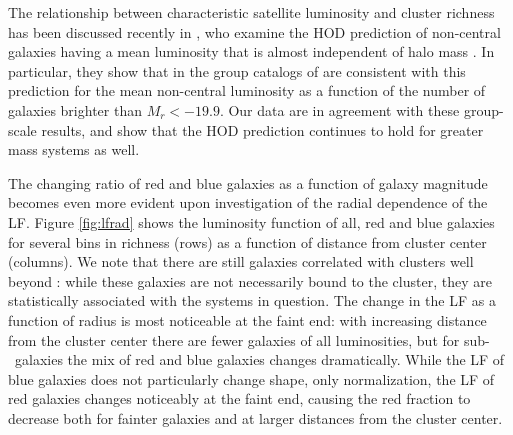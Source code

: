 \documentclass{emulateapj}
\begin{document}
\begin{figure}
\end{figure}

The relationship between characteristic satellite luminosity and
cluster richness has been discussed recently in \citet{Skibba07}, who
examine the HOD prediction of non-central galaxies having a mean
luminosity that is almost independent of halo mass
\citep{Skibba06}. In particular, they show that in the group catalogs
of \citet{Yang05,Berlind06} are consistent with this prediction for
the mean non-central luminosity as a function of the number of
galaxies brighter than $M_r < -19.9$. Our data are in agreement with
these group-scale results, and show that the HOD
prediction continues to hold for greater mass systems as well.

The changing ratio of red and blue galaxies as a function of galaxy
magnitude becomes even more evident upon investigation of the radial
dependence of the LF. Figure \ref{fig:lfrad} shows the luminosity
function of all, red and blue galaxies for several bins in richness
(rows) as a function of distance from cluster center (columns). We
note that there are still galaxies correlated with clusters well
beyond \rtwo: while these galaxies are not necessarily bound to the
cluster, they are statistically associated with the systems in
question. 
The change in the LF as a function of radius is most noticeable at the
faint end: with increasing distance from the cluster center there are
fewer galaxies of all luminosities, but for sub-\lstar\ galaxies the
mix of red and blue galaxies changes dramatically. While the LF of
blue galaxies does not particularly change shape, only normalization,
the LF of red galaxies changes noticeably at the faint end,
causing the red fraction to decrease both for fainter galaxies and at
larger distances from the cluster center.
\end{document}

